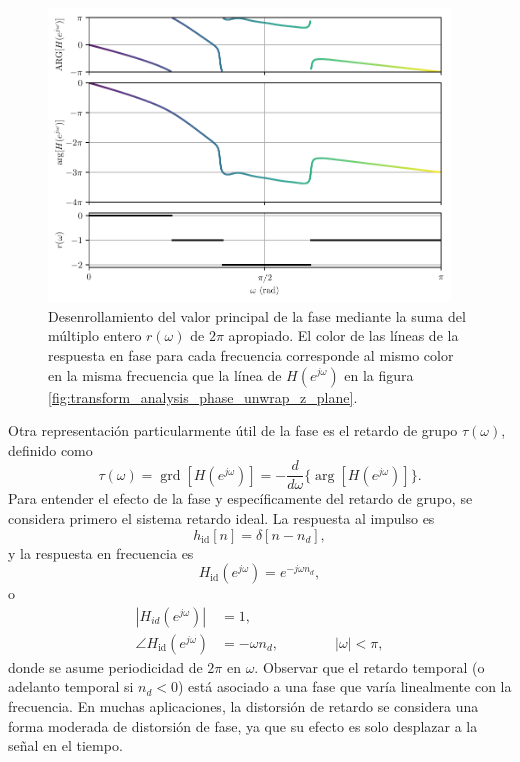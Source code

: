\documentclass[a4paper]{report}
\DeclareMathOperator{\grd}{grd}
\begin{document}
\begin{figure}[!htb]
 \begin{center}
 \includegraphics[width=0.95\textwidth]{figuras/transform_analysis_phase_unwrap.pdf}
 \caption{\label{fig:transform_analysis_phase_unwrap} Desenrollamiento del valor principal de la fase mediante la suma del múltiplo entero \(r(\omega)\) de \(2\pi\) apropiado. El color de las líneas de la respuesta en fase para cada frecuencia corresponde al mismo color en la misma frecuencia que la línea de \(H(e^{j\omega})\) en la figura \ref{fig:transform_analysis_phase_unwrap_z_plane}. }
 \end{center}
\end{figure}

Otra representación particularmente útil de la fase es el retardo de grupo \(\tau(\omega)\), definido como
\begin{equation}\label{eq:transform_analysis_group_delay_definition}
 \tau(\omega)=\grd[H(e^{j\omega})]=-\frac{d}{d\omega}\{\arg[H(e^{j\omega})]\}. 
\end{equation}
Para entender el efecto de la fase y específicamente del retardo de grupo, se considera primero el sistema retardo ideal. La respuesta al impulso es 
\[
 h_\textrm{id}[n]=\delta[n-n_d],
\]
y la respuesta en frecuencia es
\[
 H_\textrm{id}(e^{j\omega})=e^{-j\omega n_d},
\]
o
\begin{align*}
 |H_{id}(e^{j\omega})|&=1,\\
 \angle H_\textrm{id}(e^{j\omega})&=-\omega n_d,
 \qquad\qquad|\omega|<\pi,
\end{align*}
donde se asume periodicidad de \(2\pi\) en \(\omega\). Observar que el retardo temporal (o adelanto temporal si \(n_d<0\)) está asociado a una fase que varía linealmente con la frecuencia. En muchas aplicaciones, la distorsión de retardo se considera una forma moderada de distorsión de fase, ya que su efecto es solo desplazar a la señal en el tiempo.
\end{document}
